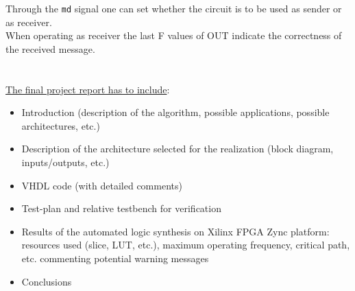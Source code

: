 \begin{displayquote}
\begin{specifications}
\begin{figure}[H]
\begin{center}
        	\label{fig:high_lvl_schematics}
    		\end{center}
    	\vspace*{-0.4cm}
\end{figure}

Through the \texttt{md} signal one can set whether the circuit is to be used as sender or as receiver.\\
When operating as receiver the last F values of OUT indicate the correctness of the received message.\\
\\
\\
\underline{The final project report has to include}:
\begin{itemize}
	\item Introduction (description of the algorithm, possible applications, possible architectures, etc.)
	\item Description of the architecture selected for the realization (block diagram, inputs/outputs, etc.)
	\item VHDL code (with detailed comments)
	\item Test-plan and relative testbench for verification
	\item Results of the automated logic synthesis on Xilinx FPGA Zync platform: resources used (slice, LUT, etc.), maximum operating frequency, critical path, etc. commenting potential warning messages
	\item Conclusions
\end{itemize}
    \end{specifications}
\end{displayquote}